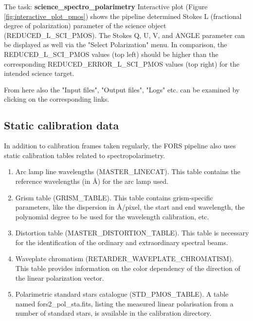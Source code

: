 The task: {\bf science\_spectro\_polarimetry} Interactive plot (Figure \ref{fig:interactive_plot_pmos}) shows the pipeline determined Stokes L (fractional degree of polarization) parameter of the science object (REDUCED\_L\_SCI\_PMOS). The Stokes Q, U, V, and ANGLE parameter can be displayed as well via the "Select Polarization" menu. In comparison, the REDUCED\_L\_SCI\_PMOS values (top left)  should be higher than the corresponding REDUCED\_ERROR\_L\_SCI\_PMOS values (top right) for the intended science target. 

From here also the "Input files", "Output files", "Logs" etc. can be examined by clicking on the corresponding links.

\subsection{Static calibration data}

In addition to calibration frames taken regularly, the FORS pipeline also uses static calibration tables related to spectropolarimetry. 

\begin{enumerate}
\item Arc lamp line wavelengths (MASTER\_LINECAT). This table contains the reference wavelengths (in Å) for the arc lamp used.
\item Grism table (GRISM\_TABLE). This table contains grism-specific parameters, like the dispersion in Å/pixel,
the start and end wavelength, the polynomial degree to be used for the wavelength calibration, etc.
\item Distortion table (MASTER\_DISTORTION\_TABLE). This table is necessary for the identification of the
ordinary and extraordinary spectral beams.
\item Waveplate chromatism (RETARDER\_WAVEPLATE\_CHROMATISM). This table provides information on
the color dependency of the direction of the linear polarization vector.
\item Polarimetric standard stars catalogue (STD\_PMOS\_TABLE). A table named fors2\_pol\_sta.fits,
listing the measured linear polarisation from a number of standard stars, is available in the calibration
directory.
\end{enumerate}



